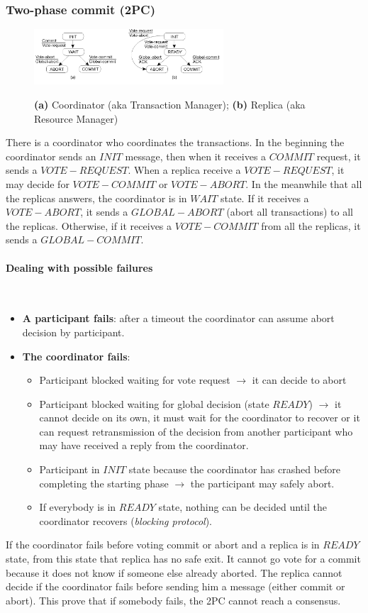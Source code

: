 \documentclass[10pt,a4paper]{article}
\newcommand{\myparagraph}[1]{\paragraph{#1}\mbox{}\\[0.05in]}
\begin{document}
\subsubsection{Two-phase commit (2PC)}
\begin{figure}[h!]
\hfill \includegraphics[width=200pt]{images/2pc.png}\hspace*{\fill}
  \label{fig:2pc}
  \caption{\textbf{(a)} Coordinator (aka Transaction Manager); \textbf{(b)} Replica (aka Resource Manager)}
\end{figure}
There is a coordinator who coordinates the transactions. In the beginning the coordinator sends an $INIT$ message, then when it receives a $COMMIT$ request, it sends a \linebreak $VOTE-REQUEST$. When a replica receive a $VOTE-REQUEST$, it may decide for $VOTE-COMMIT$ or $VOTE-ABORT$. In the meanwhile that all the replicas answers, the coordinator is in $WAIT$ state. If it receives a $VOTE-ABORT$, it sends a $GLOBAL-ABORT$ (abort all transactions) to all the replicas. Otherwise, if it receives a $VOTE-COMMIT$ from all the replicas, it sends a $GLOBAL-COMMIT$. 
\myparagraph{Dealing with possible failures}
\begin{itemize}
	\item \textbf{A participant fails}: after a timeout the coordinator can assume abort decision by participant.
	\item \textbf{The coordinator fails}:
	\begin{itemize}
		\item Participant blocked waiting for vote request $\rightarrow$ it can decide to abort
		\item Participant blocked waiting for global decision (state $READY$) $\rightarrow$ it cannot decide on its own, it must wait for the coordinator to recover or it can request retransmission of the decision from another participant who may have received a reply from the coordinator. 
		\item Participant in $INIT$ state because the coordinator has crashed before completing the starting phase $\rightarrow$ the participant may safely abort.
		\item If everybody is in $READY$ state, nothing can be decided until the coordinator recovers (\textit{blocking protocol}).
	\end{itemize}
\end{itemize}
If the coordinator fails before voting commit or abort and a replica is in $READY$ state, from this state that replica has no safe exit. It cannot go vote for a commit because it does not know if someone else already aborted. The replica cannot decide if the coordinator fails before sending him a message (either commit or abort). This prove that if somebody fails, the 2PC cannot reach a consensus.
\end{document}
